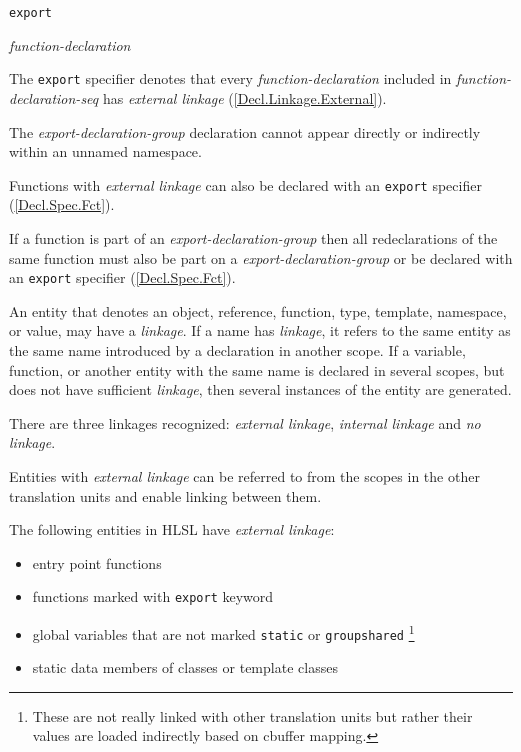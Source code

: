 \begin{grammar}
  \br
  \texttt{export} \terminal{\{}  \terminal{\}}\br
  
  \br
  \textit{function-declaration} 
\end{grammar}

\p The \texttt{export} specifier denotes that every \textit{function-declaration} included in \textit{function-declaration-seq} has \textit{external linkage} (\ref{Decl.Linkage.External}).

\p The \textit{export-declaration-group} declaration cannot appear directly or indirectly within an unnamed namespace.

\p Functions with \textit{external linkage} can also be declared with an \texttt{export} specifier (\ref{Decl.Spec.Fct}).

\p If a function is part of an \textit{export-declaration-group} then all redeclarations of the same function must also be part on a \textit{export-declaration-group} or be declared with an \texttt{export} specifier (\ref{Decl.Spec.Fct}).


\p An entity that denotes an object, reference, function, type, template, namespace, or value, may have a \textit{linkage}. If a name has \textit{linkage}, it refers to the same entity as the same name introduced by a declaration in another scope. If a variable, function, or another entity with the same name is declared in several scopes, but does not have sufficient \textit{linkage}, then several instances of the entity are generated.

\p There are three linkages recognized: \textit{external linkage}, \textit{internal linkage} and \textit{no linkage}.


\p Entities with \textit{external linkage} can be referred to from the scopes in the other translation units and enable linking between them.

\p The following entities in HLSL have \textit{external linkage}:
\begin{itemize}
  \item entry point functions
  \item functions marked with \texttt{export} keyword
  \item global variables that are not marked \texttt{static} or \texttt{groupshared} \footnote{These are not really linked with other translation units but rather their values are loaded indirectly based on cbuffer mapping.}
  \item static data members of classes or template classes
\end{itemize}

